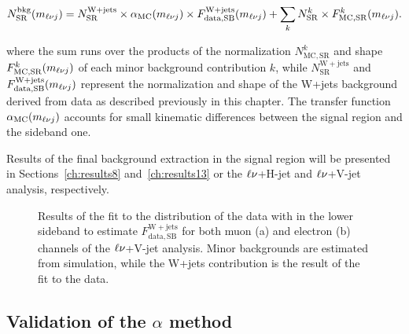 \begin{equation}\label{eqn:alpha_totalBkg}
N_\mathrm{SR}^\mathrm{bkg}(m_{\ell\nu j}) = N_\mathrm{SR}^\mathrm{W+jets} \times \alpha_\mathrm{MC}(m_{\ell\nu j}) \times F_\mathrm{data, SB}^{\mathrm{W+jets}}(m_{\ell\nu j}) + \sum_{k} N_\mathrm{SR}^k \times F_\mathrm{MC,SR}^k(m_{\ell\nu j}).
\end{equation}

where the sum runs over the products of the normalization $N_\mathrm{MC,SR}^k$ and shape $F_\mathrm{MC,SR}^k(m_{\ell\nu j})$ of each minor background contribution $k$, while $N_\mathrm{SR}^\mathrm{W+jets}$ and $F_\mathrm{data, SB}^{\mathrm{W+jets}}(m_{\ell\nu j})$ represent the normalization and shape of the W+jets background derived from data as described previously in this chapter. The transfer function $\alpha_\mathrm{MC}(m_{\ell\nu j})$ accounts for small kinematic differences between the signal region and the sideband one.

Results of the final background extraction in the signal region will be presented in Sections~\ref{ch:results8} and~\ref{ch:results13} or the $\ell\nu$+H-jet and $\ell\nu$+V-jet analysis, respectively.

\begin{figure}[!htb]
\centering
{}
\caption{Results of the fit to the \mWV distribution of the data with \mJ in the lower sideband to estimate $F_\mathrm{data, SB}^{\mathrm{W+jets}}$ for both muon (a) and electron (b) channels of the $\ell\nu$+V-jet analysis. Minor backgrounds are estimated from simulation, while the W+jets contribution is the result of the fit to the data.}
\label{fig:sbfitmlvj13TeV}
\end{figure}

\subsection{Validation of the $\alpha$ method}

